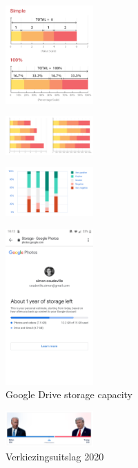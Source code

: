 \documentclass{article}
\begin{document}
\begin{figure}[H]
    \centering
    \includegraphics[width=0.3\textwidth]{dv-stackedbarchart1.png}
    \caption{}
\end{figure}
\begin{figure}[H]
    \centering
    \includegraphics[width=0.3\textwidth]{dv-stackedbarchart2.png}
    \caption{}
\end{figure}
\begin{figure}[H]
    \centering
    \includegraphics[width=0.3\textwidth]{dv-stackedbarchart3.png}
    \caption{}
\end{figure}
\begin{figure}[H]
    \centering
    \includegraphics[width=0.3\textwidth]{dv-stackedbarchart4.png}
    \caption{Google Drive storage capacity}
\end{figure}
\begin{figure}[H]
    \centering
    \includegraphics[width=0.3\textwidth]{dv-stackedbarchart5.png}
    \caption{Verkiezingsuitslag 2020}
\end{figure}
\end{document}
